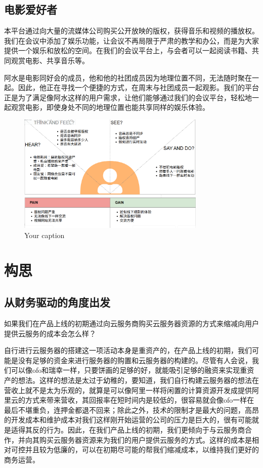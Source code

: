 \documentclass[a4paper,12pt]{article}
\begin{document}
\subsection{电影爱好者}
本平台通过向大量的流媒体公司购买公开放映的版权，获得音乐和视频的播放权。我们在会议中添加了娱乐功能，让会议不再局限于严肃的教学和办公，而是为大家提供一个娱乐和放松的空间。在我们的会议平台上，与会者可以一起阅读书籍、共同观赏电影、共享音乐等。

阿水是电影同好会的成员，他和他的社团成员因为地理位置不同，无法随时聚在一起。因此，他正在寻找一个便捷的方式，在周末与社团成员一起观影。我们的平台正是为了满足像阿水这样的用户需求，让他们能够通过我们的会议平台，轻松地一起观赏电影，即使身处不同的地理位置也能共享同样的娱乐体验。
\begin{figure}[h]
    \centering
    \includegraphics[width=0.8\textwidth]{电影爱好者移情图.png}
    \caption{Your caption}
\end{figure}
\clearpage

\section{构思}
\subsection{从财务驱动的角度出发}
如果我们在产品上线的初期通过向云服务商购买云服务器资源的方式来缩减向用户提供云服务的成本会怎么样？

自行进行云服务器的搭建这一项活动本身是重资产的，在产品上线的初期，我们可能是没有足够的资金来进行服务器的购置和云服务器的构建的。尽管有人会说，我们可以像ofo和瑞幸一样，只要饼画的足够的好，就能吸引足够的融资来实现重资产的想法。这样的想法是太过于幼稚的，要知道，我们自行构建云服务器的想法在营收上就不是太为乐观的，就算是可以像阿里一样将闲置的计算资源开发成提供阿里云的方式来带来营收，其回报率在短时间内是较低的，很容易就会像ofo一样在最后不堪重负，连押金都退不回来；除此之外，技术的限制才是最大的问题，高昂的开发成本和维护成本对我们这样刚开始运营的公司的压力是巨大的，很有可能就是适得其反的行为。因此，在我们产品上线的初期，我们更倾向于与云服务商合作，并向其购买云服务器资源来为我们的用户提供云服务的方式。这样的成本是相对可控并且较为低廉的，可以在初期尽可能的帮我们缩减成本，以维持我们更好的商务运营。
\end{document}
